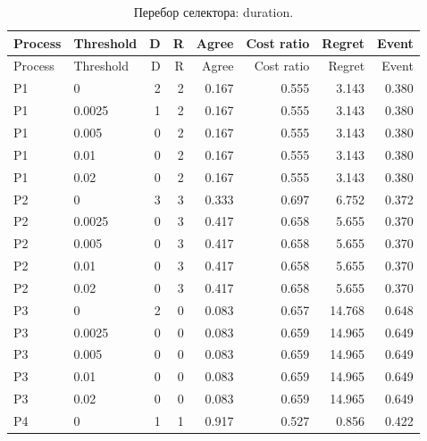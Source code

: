\begingroup\small\setlength{\tabcolsep}{3pt}\begin{longtable}{llrrrrrr}\caption{Перебор селектора: duration.}\\\toprule

Process & Threshold & D & R & Agree & Cost ratio & Regret & Event\\\midrule\endfirsthead

\toprule Process & Threshold & D & R & Agree & Cost ratio & Regret & Event\\\midrule\endhead

P1 & 0 & 2 & 2 & 0.167 & 0.555 & 3.143 & 0.380\\

P1 & 0.0025 & 1 & 2 & 0.167 & 0.555 & 3.143 & 0.380\\

P1 & 0.005 & 0 & 2 & 0.167 & 0.555 & 3.143 & 0.380\\

P1 & 0.01 & 0 & 2 & 0.167 & 0.555 & 3.143 & 0.380\\

P1 & 0.02 & 0 & 2 & 0.167 & 0.555 & 3.143 & 0.380\\

P2 & 0 & 3 & 3 & 0.333 & 0.697 & 6.752 & 0.372\\

P2 & 0.0025 & 0 & 3 & 0.417 & 0.658 & 5.655 & 0.370\\

P2 & 0.005 & 0 & 3 & 0.417 & 0.658 & 5.655 & 0.370\\

P2 & 0.01 & 0 & 3 & 0.417 & 0.658 & 5.655 & 0.370\\

P2 & 0.02 & 0 & 3 & 0.417 & 0.658 & 5.655 & 0.370\\

P3 & 0 & 2 & 0 & 0.083 & 0.657 & 14.768 & 0.648\\

P3 & 0.0025 & 0 & 0 & 0.083 & 0.659 & 14.965 & 0.649\\

P3 & 0.005 & 0 & 0 & 0.083 & 0.659 & 14.965 & 0.649\\

P3 & 0.01 & 0 & 0 & 0.083 & 0.659 & 14.965 & 0.649\\

P3 & 0.02 & 0 & 0 & 0.083 & 0.659 & 14.965 & 0.649\\

P4 & 0 & 1 & 1 & 0.917 & 0.527 & 0.856 & 0.422\\


\end{longtable}

